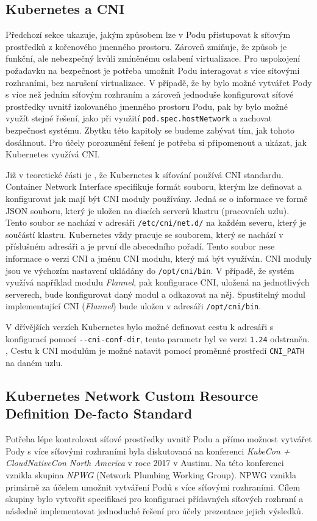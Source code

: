 \subsection{Kubernetes a CNI}
Předchozí sekce ukazuje, jakým způsobem lze v Podu přistupovat k síťovým prostředků z kořenového jmenného prostoru. Zároveň zmiňuje, že způsob je funkční, ale nebezpečný kvůli zmíněnému oslabení virtualizace. Pro uspokojení požadavku na bezpečnost je potřeba umožnit Podu interagovat s více sítovými rozhraními, bez narušení virtualizace. V případě, že by bylo možné vytvářet Pody s více než jedním síťovým rozhraním a zároveň jednoduše konfigurovat síťové prostředky uvnitř izolovaného jmenného prostoru Podu, pak by bylo možné využít stejné řešení, jako při využití \verb|pod.spec.hostNetwork| a zachovat bezpečnost systému. Zbytku této kapitoly se budeme zabývat tím, jak tohoto dosáhnout. Pro účely porozumění řešení je potřeba si připomenout a ukázat, jak Kubernetes využívá CNI.

Již v teoretické části je , že Kubernetes k síťování používá CNI standardu. Container Network Interface specifikuje formát souboru, kterým lze definovat a konfigurovat jak mají být CNI moduly používány. Jedná se o informace ve formě JSON souboru, který je uložen na discích serverů klastru (pracovních uzlu). Tento soubor se nachází v adresáři \verb|/etc/cni/net.d/| na každém severu, který je součástí klastru. Kubernetes vždy pracuje se souborem, který se nachází v příslušném adresáři a je první dle abecedního pořadí. Tento soubor nese informace o verzi CNI a jménu CNI modulu, který má být využíván. CNI moduly jsou ve výchozím nastavení ukládány do \verb|/opt/cni/bin|. V případě, že systém využívá například modulu \textit{Flannel}, pak konfigurace CNI, uložená na jednotlivých serverech, bude konfigurovat daný modul a odkazovat na něj. Spustitelný modul implementující CNI (\textit{Flannel}) bude uložen v adresáři \verb|/opt/cni/bin|.

V dřívějších verzích Kubernetes bylo možné definovat cestu k adresáři s konfigurací pomocí \verb|--cni-conf-dir|, tento parametr byl ve verzi \verb|1.24| odstraněn. \cite{k8scirobot_2020_merge}, \cite{thekubernetesauthors_2022_networkPlugins} Cestu k CNI modulům je možné natavit pomocí proměnné prostředí \verb|CNI_PATH| na daném uzlu.

\subsection{Kubernetes Network Custom Resource Definition De-facto Standard}\label{sec:kncrdds}
Potřeba lépe kontrolovat síťové prostředky uvnitř Podu a přímo možnost vytvářet Pody s více síťovými rozhraními byla diskutovaná na konferenci \textit{KubeCon + CloudNativeCon North America} v roce 2017 v Austinu. \cite{woods_2018_a} Na této konferenci vznikla skupina \textit{NPWG} (Network Plumbing Working Group). NPWG vznikla primárně za účelem umožnit vytváření Podů s více síťovými rozhraními. Cílem skupiny bylo vytvořit specifikaci pro konfiguraci přídavných síťových rozhraní a následně implementovat jednoduché řešení pro účely prezentace jejich výsledků.

